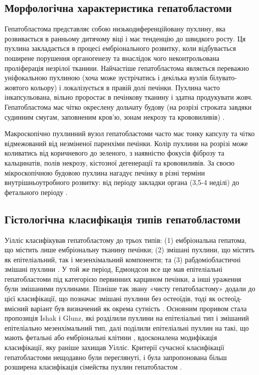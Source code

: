 \subsection{Морфологічна характеристика гепатобластоми}
  
Гепатобластома представляє собою низькодиференційовану пухлину, яка розвивається в ранньому дитячому віці і має тенденцію до швидкого росту. Ця пухлина закладається в процесі ембріонального розвитку, коли відбувається поширене порушення органогенезу та внаслідок чого неконтрольована проліферація незрілої тканини. Найчастіше гепатобластома являється переважно уніфокальною пухлиною (хоча може зустрічатись і декілька вузлів білувато-жовтого кольору) і локалізується  в правій долі печінки. Пухлина часто інкапсульована, вільно проростає в печінкову тканину і здатна продукувати жовч. Гепатобластома має  чітко окреслену дольчату будову (на розрізі строката завдяки  судинним смугам, заповненим кров’ю, зонам некрозу та крововиливів) \cite{pmid32421442}.

Макроскопічно пухлинний вузол гепатобластоми часто має тонку капсулу та чітко відмежований від незміненої  паренхіми печінки. Колір пухлини на розрізі може коливатись від коричневого до зеленого, з наявністю фокусів фіброзу та кальцинатів, полів некрозу, кістозної дегенерації та крововиливів. 
За своєю мікроскопічною будовою пухлина нагадує печінку в різні терміни  внутрішньоутробного розвитку: від періоду закладки органа (3,5-4 неділі) до фетального періоду \cite{pmid20070564}.

\subsection{Гістологічна класифікація типів гепатобластоми}
 Уілліс класифікував гепатобластому до трьох типів: (1) ембріональна гепатома, що містить лише ембріональну тканину печінки; (2) змішані пухлини, що містять як епітеліальний, так і мезенхімальний компоненти; та (3) рабдоміобластичні змішані пухлини \cite{pmid24852330}. У той же період, Едмондсон все ще мав епітеліальні гепатобластоми під категорією первинних карцином печінки, а інші ураження були змішаними пухлинами. Пізніше так звану «чисту гепатобластому» додали до цієї класифікації, що позначає змішані пухлини без остеоїдів, тоді як остеоїд-вмісний варіант був визначений як окрема сутність \cite{pmid32421442}. Основним проривом стала пропозиція Ishak і Glunz, які розділили пухлини на епітеліальні тип і змішаний епітеліально мезенхімальний тип, далі поділили епітеліальні пухлин на такі, що мають фетальні або ембріональні клітини \cite{pmid20070564}, вдосконалена модифікація класифікації, яку раніше захищав Уілліс. Критерії сучасної класифікації гепатобластоми нещодавно були переглянуті, і була запропонована більш розширена класифікація сімейства пухлин гепатобластом \cite{pmid24759227}. 


